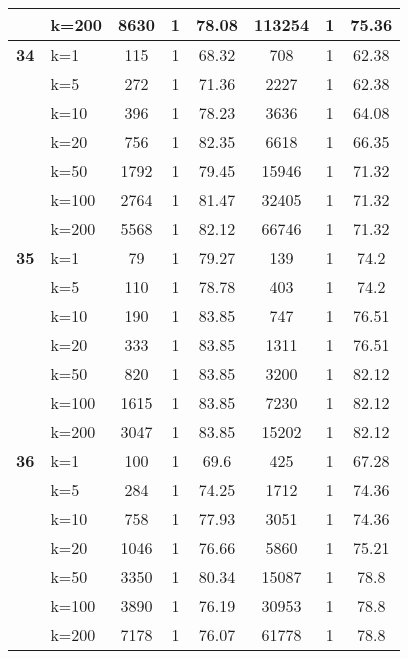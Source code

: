 \begin{table}[htbp]
\begin{tabular}{ll|ccc|ccc}
     & k=200 & 8630 & 1 & 78.08 & 113254 & 1 & 75.36 \\ \hline
    \multicolumn{1}{r}{\textbf{34}} & k=1 & 115 & 1 & 68.32 & 708 & 1 & 62.38 \\ 
     & k=5 & 272 & 1 & 71.36 & 2227 & 1 & 62.38 \\ 
     & k=10 & 396 & 1 & 78.23 & 3636 & 1 & 64.08 \\ 
     & k=20 & 756 & 1 & 82.35 & 6618 & 1 & 66.35 \\ 
     & k=50 & 1792 & 1 & 79.45 & 15946 & 1 & 71.32 \\ 
     & k=100 & 2764 & 1 & 81.47 & 32405 & 1 & 71.32 \\ 
     & k=200 & 5568 & 1 & 82.12 & 66746 & 1 & 71.32 \\ \hline
    \multicolumn{1}{r}{\textbf{35}} & k=1 & 79 & 1 & 79.27 & 139 & 1 & 74.2 \\ 
     & k=5 & 110 & 1 & 78.78 & 403 & 1 & 74.2 \\ 
     & k=10 & 190 & 1 & 83.85 & 747 & 1 & 76.51 \\ 
     & k=20 & 333 & 1 & 83.85 & 1311 & 1 & 76.51 \\ 
     & k=50 & 820 & 1 & 83.85 & 3200 & 1 & 82.12 \\ 
     & k=100 & 1615 & 1 & 83.85 & 7230 & 1 & 82.12 \\ 
     & k=200 & 3047 & 1 & 83.85 & 15202 & 1 & 82.12 \\ \hline
    \multicolumn{1}{r}{\textbf{36}} & k=1 & 100 & 1 & 69.6 & 425 & 1 & 67.28 \\ 
     & k=5 & 284 & 1 & 74.25 & 1712 & 1 & 74.36 \\ 
     & k=10 & 758 & 1 & 77.93 & 3051 & 1 & 74.36 \\ 
     & k=20 & 1046 & 1 & 76.66 & 5860 & 1 & 75.21 \\ 
     & k=50 & 3350 & 1 & 80.34 & 15087 & 1 & 78.8 \\ 
     & k=100 & 3890 & 1 & 76.19 & 30953 & 1 & 78.8 \\ 
     & k=200 & 7178 & 1 & 76.07 & 61778 & 1 & 78.8 \\ \hline
    \end{tabular}
    \label{use_case_6}
    \end{table}
    
